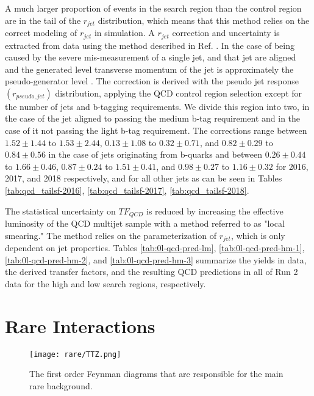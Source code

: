 A much larger proportion of events in the search region than the control region are in the tail of the $r_{jet}$ distribution, which means that this method relies on the correct modeling of $r_{jet}$ in simulation. A $r_{jet}$ correction and uncertainty is extracted from data using the method described in Ref. \cite{cms_collaboration_search_2016}. In the case of \met{} being caused by the severe mis-measurement of a single jet, \met{} and that jet are aligned and the generated level transverse momentum of the jet is approximately the pseudo-generator level \pt. The correction is derived with the pseudo jet response $(r_{pseudo,jet})$ distribution, applying the QCD control region selection except for the number of jets and b-tagging requirements. We divide this region into two, in the case of the jet aligned to \met{} passing the medium b-tag requirement and in the case of it not passing the light b-tag requirement. The corrections range between $1.52\pm1.44$ to $1.53\pm2.44$, $0.13\pm1.08$ to $0.32\pm0.71$, and $0.82\pm0.29$ to $0.84\pm0.56$ in the case of jets originating from b-quarks and between $0.26\pm0.44$ to $1.66\pm0.46$, $0.87\pm0.24$ to $1.51\pm0.41$, and $0.98\pm0.27$ to $1.16\pm0.32$ for 2016, 2017, and 2018 respectively, and for all other jets as can be seen in Tables \ref{tab:qcd_tailsf-2016}, \ref{tab:qcd_tailsf-2017}, \ref{tab:qcd_tailsf-2018}.



The statistical uncertainty on $TF_{QCD}$ is reduced by increasing the effective luminosity of the QCD multijet sample with a method referred to as "local smearing." The method relies on the parameterization of $r_{jet}$, which is only dependent on jet properties. Tables \ref{tab:0l-qcd-pred-lm}, \ref{tab:0l-qcd-pred-hm-1}, \ref{tab:0l-qcd-pred-hm-2}, and \ref{tab:0l-qcd-pred-hm-3} summarize the yields in data, the derived transfer factors, and the resulting QCD predictions in all \datalumi{} of Run 2 data for the high \dm{} and low \dm{} search regions, respectively. 






\section{Rare Interactions}
\label{subsec:rare}

\begin{figure}
	\begin{center}
  \texttt{[image: rare/TTZ.png]}
	\end{center}
	\caption[Diboson and $ttZ$ Feynman Diagrams]{The first order Feynman diagrams that are responsible for the main rare background.}
	\label{fig:rare-feynman-diagrams}
\end{figure}

